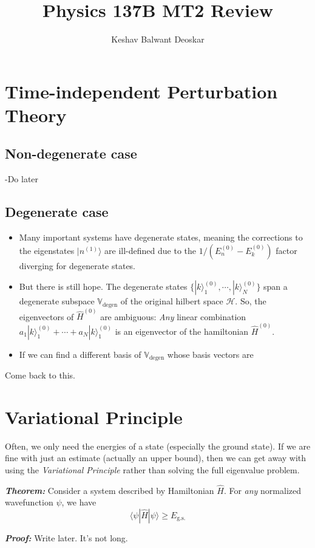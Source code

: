 \documentclass{article}
\title{Physics 137B MT2 Review}
\author{Keshav Balwant Deoskar}
\newcommand{\ket}[1]{|#1 \rangle}
\newcommand{\inner}[2]{\langle #1 | #2 \rangle}
\begin{document}
\maketitle

\tableofcontents

\pagebreak
\section{Time-independent Perturbation Theory}

\subsection{Non-degenerate case}
-Do later

\subsection{Degenerate case}
\begin{itemize}
  \item Many important systems have degenerate states, meaning the corrections to the eigenstates $\ket{n^{(1)}}$ are ill-defined due to the $1/(E^{(0)}_n - E^{(0)}_k)$ factor diverging for degenerate states.
  \item But there is still hope. The degenerate states $\{ \ket{k}_{1}^{(0)}, \cdots, \ket{k}_{N}^{(0)} \}$ span a degenerate subspace $\mathbb{V}_{\text{degen}}$ of the original hilbert space $\mathcal{H}$. So, the eigenvectors of $\hat{H}^{(0)}$ are ambiguous: \emph{Any} linear combination $a_1 \ket{k}_{1}^{(0)} + \cdots + a_N \ket{k}_{1}^{(0)}$ is an eigenvector of the hamiltonian $\hat{H}^{(0)}$.
  \item If we can find a different basis of $\mathbb{V}_{\text{degen}}$ whose basis vectors are 
\end{itemize}

Come back to this.

\pagebreak

\section{Variational Principle}

Often, we only need the energies of a state (especially the ground state). If we are fine with just an estimate (actually an upper bound), then we can get away with using the \emph{Variational Principle} rather than solving the full eigenvalue problem.

\vskip 0.5cm
\begin{dottedbox}
  \textbf{\emph{Theorem:}} Consider a system described by Hamiltonian $\hat{H}$. For \emph{any} normalized wavefunction $\psi$, we have 
  \[ \inner{\psi}{\hat{H}|\psi}  \geq E_{\text{g.s.}} \] 

  \vskip 0.5cm
  \emph{\textbf{Proof:}} Write later. It's not long.
\end{dottedbox}
\end{document}
